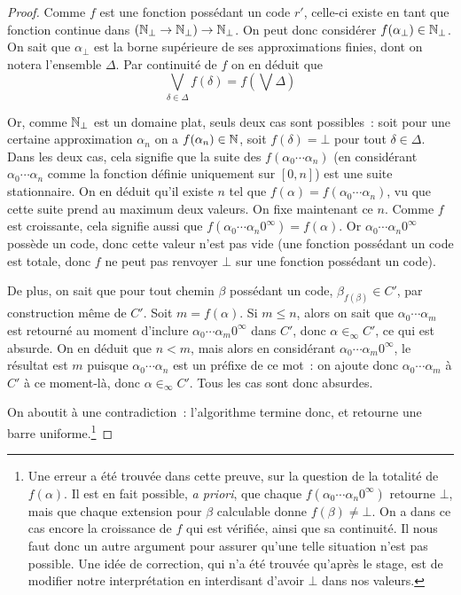 \documentclass{article}
\begin{document}
\begin{proof}
    Comme $f$ est une fonction possédant un code $r'$, celle-ci existe en tant que fonction continue dans $(\mathbb{N}_\bot\to\mathbb{N}_\bot)\to\mathbb{N}_\bot$. On peut donc considérer $f(\alpha_\bot)\in\mathbb{N}_\bot$. On sait que $\alpha_\bot$ est la borne supérieure de ses approximations finies, dont on notera l'ensemble $\Delta$. Par continuité de $f$ on en déduit que
    \[\bigvee_{\delta \in \Delta} f(\delta) = f\left(\bigvee \Delta\right)\]

    Or, comme $\mathbb{N}_\bot$ est un domaine plat, seuls deux cas sont possibles~: soit pour une certaine approximation $\alpha_n$ on a $f(\alpha_n) \in \mathbb{N}$, soit $f(\delta) = \bot$ pour tout $\delta\in\Delta$. Dans les deux cas, cela signifie que la suite des $f(\alpha_0\cdots \alpha_n)$ (en considérant $\alpha_0\cdots\alpha_n$ comme la fonction définie uniquement sur $[0,n]$) est une suite stationnaire. On en déduit qu'il existe $n$ tel que $f(\alpha) = f(\alpha_0\cdots \alpha_n)$, vu que cette suite prend au maximum deux valeurs. On fixe maintenant ce $n$. Comme $f$ est croissante, cela signifie aussi que $f(\alpha_0\cdots\alpha_n 0^\infty) = f(\alpha)$. Or $\alpha_0\cdots\alpha_n 0^\infty$ possède un code, donc cette valeur n'est pas vide (une fonction possédant un code est totale, donc $f$ ne peut pas renvoyer $\bot$ sur une fonction possédant un code).

    De plus, on sait que pour tout chemin $\beta$ possédant un code, $\beta_{f(\beta)} \in C'$, par construction même de $C'$. Soit $m = f(\alpha)$. Si $m \leq n$, alors on sait que $\alpha_0\cdots \alpha_m$ est retourné au moment d'inclure $\alpha_0\cdots\alpha_m 0^\infty$ dans $C'$, donc $\alpha \in_\infty C'$, ce qui est absurde. On en déduit que $n < m$, mais alors en considérant $\alpha_0\cdots \alpha_m 0^\infty$, le résultat est $m$ puisque $\alpha_0\cdots \alpha_n$ est un préfixe de ce mot~: on ajoute donc $\alpha_0\cdots \alpha_m$ à $C'$ à ce moment-là, donc $\alpha \in_\infty C'$. Tous les cas sont donc absurdes.

    On aboutit à une contradiction~: l'algorithme termine donc, et retourne une barre uniforme.\footnote{Une erreur a été trouvée dans cette preuve, sur la question de la totalité de $f(\alpha)$. Il est en fait possible, \textit{a priori}, que chaque $f(\alpha_0\cdots\alpha_n0^\infty)$ retourne $\bot$, mais que chaque extension pour $\beta$ calculable donne $f(\beta) \neq \bot$. On a dans ce cas encore la croissance de $f$ qui est vérifiée, ainsi que sa continuité. Il nous faut donc un autre argument pour assurer qu'une telle situation n'est pas possible. Une idée de correction, qui n'a été trouvée qu'après le stage, est de modifier notre interprétation en interdisant d'avoir $\bot$ dans nos valeurs.}
\end{proof}
\end{document}
